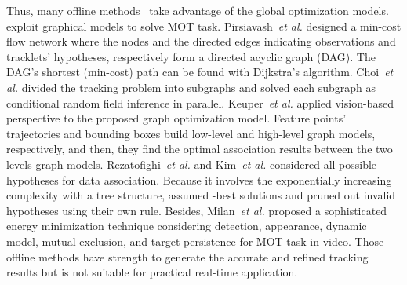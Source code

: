 \documentclass[journal]{IEEEtran}
\newcounter{ct}
\begin{document}
Thus, many offline methods~\cite{jcc,mhtdam,jpdam,nomt,dpnms,cem} take advantage of the global optimization models. 
~\cite{dpnms,nomt,jcc} exploit graphical models to solve MOT task.
Pirsiavash~\textit{et al.}\cite{dpnms} designed a min-cost flow network where the nodes and the directed edges indicating observations and tracklets' hypotheses, respectively form a directed acyclic graph (DAG). The DAG's shortest (min-cost) path can be found with Dijkstra's algorithm.
Choi~\textit{et al.}\cite{nomt} divided the tracking problem into subgraphs and solved each subgraph as conditional random field inference in parallel. Keuper~\textit{et al.}\cite{jcc} applied vision-based perspective to the proposed graph optimization model. Feature points' trajectories and bounding boxes build low-level and high-level graph models, respectively, and then, they find the optimal association results between the two levels graph models.
Rezatofighi~\textit{et al.}\cite{jpdam} and Kim~\textit{et al.}\cite{mhtdam} considered all possible hypotheses for data association. Because it involves the exponentially increasing complexity with a tree structure, \cite{jpdam} assumed -best solutions and \cite{mhtdam} pruned out invalid hypotheses using their own rule. 
Besides, Milan~\textit{et al.}\cite{cem} proposed a sophisticated energy minimization technique considering detection, appearance, dynamic model, mutual exclusion, and target persistence for MOT task in video.
Those offline methods have strength to generate the accurate and refined tracking results but is not suitable for practical real-time application.
\end{document}
